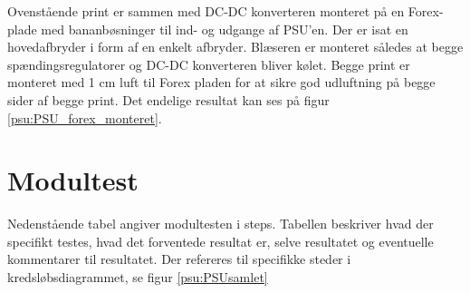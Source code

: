 Ovenstående print er sammen med DC-DC konverteren monteret på en Forex-plade med bananbøsninger til ind- og udgange af PSU'en. Der er isat en hovedafbryder i form af en enkelt afbryder. Blæseren er monteret således at begge spændingsregulatorer og DC-DC konverteren bliver kølet. Begge print er monteret med 1 cm luft til Forex pladen for at sikre god udluftning på begge sider af begge print. Det endelige resultat kan ses på figur  \ref{psu:PSU_forex_monteret}.


\section{Modultest}

Nedenstående tabel angiver modultesten i steps. Tabellen beskriver hvad der specifikt testes, hvad det forventede resultat er, selve resultatet og eventuelle kommentarer til resultatet. Der refereres til specifikke steder i kredsløbsdiagrammet, se figur \ref{psu:PSUsamlet}

